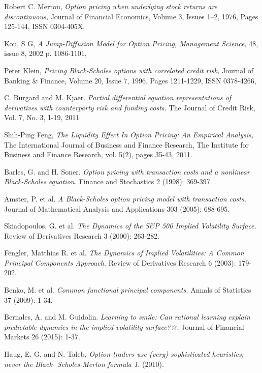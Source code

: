 \documentclass[11pt,a4paper,oldfontcommands]{memoir}
\begin{document}
{\begin{thebibliography}{53}
Robert C. Merton, \textit{Option pricing when underlying stock returns are discontinuous,} Journal of Financial Economics, Volume 3, Issues 1–2, 1976, Pages 125-144, ISSN 0304-405X, 

Kou, S G, \textit{A Jump-Diffusion Model for Option Pricing, Management Science,} 48, issue 8, 2002 p. 1086-1101, 

Peter Klein, \textit{Pricing Black-Scholes options with correlated credit risk,} Journal of Banking & Finance, Volume 20, Issue 7, 1996, Pages 1211-1229, ISSN 0378-4266, 

C. Burgard and M. Kjaer. \textit{Partial differential equation representations of derivatives with counterparty risk and funding costs.} The Journal of Credit Risk, Vol. 7, No. 3, 1-19, 2011

Shih-Ping Feng, \textit{The Liquidity Effect In Option Pricing: An Empirical Analysis,} The International Journal of Business and Finance Research, The Institute for Business and Finance Research, vol. 5(2), pages 35-43, 2011.

Barles, G. and H. Soner. \textit{Option pricing with transaction costs and a nonlinear Black-Scholes equation.} Finance and Stochastics 2 (1998): 369-397.

Amster, P. et al. \textit{A Black-Scholes option pricing model with transaction costs.} Journal of Mathematical Analysis and Applications 303 (2005): 688-695.

Skiadopoulos, G. et al. \textit{The Dynamics of the S&P 500 Implied Volatility Surface.} Review of Derivatives Research 3 (2000): 263-282.

Fengler, Matthias R. et al. \textit{The Dynamics of Implied Volatilities: A Common Principal Components Approach.} Review of Derivatives Research 6 (2003): 179-202.

Benko, M. et al. \textit{Common functional principal components.} Annals of Statistics 37 (2009): 1-34.

Bernales, A. and M. Guidolin. \textit{Learning to smile: Can rational learning explain predictable dynamics in the implied volatility surface?☆.} Journal of Financial Markets 26 (2015): 1-37.

Haug, E. G. and N. Taleb. \textit{Option traders use (very) sophisticated heuristics, never the Black- Scholes-Merton formula 1.} (2010).



\end{thebibliography}}
\end{document}
